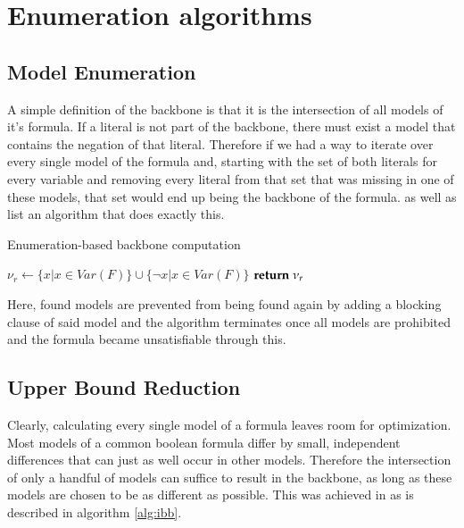 \section{Enumeration algorithms}
\subsection{Model Enumeration}
A simple definition of the backbone is that it is the intersection of all models of it's formula. If a literal is not part of the backbone, there must exist a model that contains the negation of that literal. Therefore if we had a way to iterate over every single model of the formula and, starting with the set of both literals for every variable and removing every literal from that set that was missing in one of these models, that set would end up being the backbone of the formula. \cite{mjl10} as well as \cite{mjl15} list an algorithm that does exactly this. 

\begin{algorithm} %
\caption{{\sc Enumeration-based backbone computation}}
\DontPrintSemicolon
{}
$\nu_r \gets \{ x | x \in Var(F) \} \cup \{ \neg x | x \in Var(F) \}$\;
$\Return\; \nu_r$\;
\end{algorithm}

Here, found models are prevented from being found again by adding a blocking clause of said model and the algorithm terminates once all models are prohibited and the formula became unsatisfiable through this.

\subsection{Upper Bound Reduction}

Clearly, calculating every single model of a formula leaves room for optimization. Most models of a common boolean formula differ by small, independent differences that can just as well occur in other models. Therefore the intersection of only a handful of models can suffice to result in the backbone, as long as these models are chosen to be as different as possible. This was achieved in \cite{mjl15} as is described in algorithm \ref{alg:ibb}.

